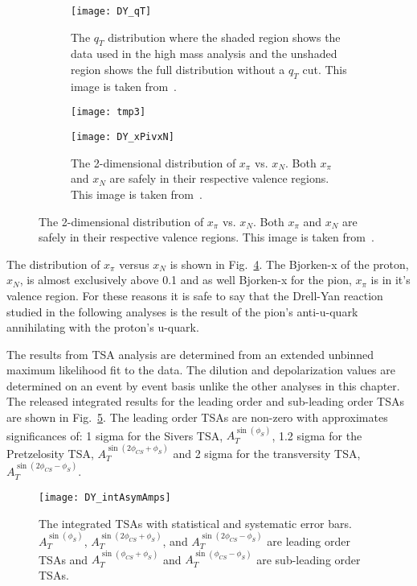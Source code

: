 \begin{figure}[h!t]
  \centering
  \begin{subfigure}{0.45\textwidth}
    \centering \texttt{[image: DY\_qT]}
    \caption{The $q_T$ distribution where the shaded region shows the data used
      in the high mass analysis and the unshaded region shows the full
      distribution without a $q_T$ cut.  This image is taken
      from~\cite{compassDYpaper}.}
    \label{fig::DY_qT}
  \end{subfigure}
  \begin{subfigure}{.02\textwidth}
    \texttt{[image: tmp3]}
    \label{fig::tmp2}%
  \end{subfigure}
    \begin{subfigure}{0.48\textwidth}
    \centering \texttt{[image: DY\_xPivxN]}
    \caption{The 2-dimensional distribution of $x_{\pi}$ vs. $x_{N}$.  Both
      $x_{\pi}$ and $x_N$ are safely in their respective valence regions.  This
      image is taken from~\cite{compassDYpaper}.}
    \label{fig::DY_xPivxN}
  \end{subfigure}
\end{figure}

The distribution of $x_{\pi}$ versus $x_N$ is shown in
Fig.~\ref{fig::DY_xPivxN}.  The Bjorken-x of the proton, $x_N$, is almost
exclusively above 0.1 and as well Bjorken-x for the pion, $x_{\pi}$ is in it's
valence region.  For these reasons it is safe to say that the Drell-Yan reaction
studied in the following analyses is the result of the pion's anti-u-quark
annihilating with the proton's u-quark.

The results from TSA analysis are determined from an extended unbinned maximum
likelihood fit to the data.  The dilution and depolarization values are
determined on an event by event basis unlike the other analyses in this chapter.
The released integrated results for the leading order and sub-leading order TSAs
are shown in Fig.~\ref{fig::DY_intAsymAmps}.  The leading order TSAs are
non-zero with approximates significances of: 1 sigma for the Sivers TSA,
$A_T^{\sin(\phi_S)}$, 1.2 sigma for the Pretzelosity TSA,
$A_T^{\sin(2\phi_{CS}+\phi_S)}$ and 2 sigma for the transversity TSA,
$A_T^{\sin(2\phi_{CS}-\phi_S)}$.

\begin{figure}[h!t]
  \centering \texttt{[image: DY\_intAsymAmps]}
  \caption{The integrated TSAs with statistical and systematic error bars.
    $A_T^{\sin(\phi_S)}$, $A_T^{\sin(2\phi_{CS}+\phi_S)}$, and
    $A_T^{\sin(2\phi_{CS}-\phi_S)}$ are leading order TSAs and
    $A_T^{\sin(\phi_{CS}+\phi_S)}$ and $A_T^{\sin(\phi_{CS}-\phi_S)}$ are
    sub-leading order TSAs.}
  \label{fig::DY_intAsymAmps}
\end{figure}

